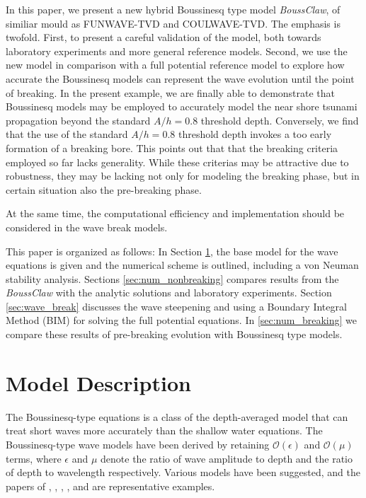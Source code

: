 \documentclass[review]{elsarticle}
\begin{document}
In this paper, we present a new hybrid Boussinesq type model {\em BoussClaw}, 
of similiar mould as FUNWAVE-TVD and COULWAVE-TVD. The emphasis is twofold.
First, to present a careful validation of the model, both towards  
laboratory experiments and more general reference models. Second, we use the new model
in comparison with a full potential reference model to explore how accurate the Boussinesq models 
can represent the wave evolution until the point of breaking. In the present example,
we are finally able to demonstrate that Boussinesq models may be employed
to accurately model the near shore tsunami propagation beyond the standard $A/h = 0.8$ threshold depth.
Conversely, we find that the use of the standard $A/h = 0.8$ threshold depth 
invokes a too early formation of a breaking bore. This points out that  
that the breaking criteria employed so far lacks generality.
While these criterias may be attractive due to robustness, 
they may be lacking not only for modeling the breaking phase, but in certain situation also the pre-breaking phase.

At the same time, the computational efficiency and implementation
should be considered in the wave break models. 

This paper is organized as follows: In Section \ref{sec:model}, the base model
for the wave equations is given and the numerical scheme is outlined, including a von Neuman stability analysis. 
Sections \ref{sec:num_nonbreaking} compares results from the {\em BoussClaw} with
the analytic solutions and laboratory experiments. 
Section \ref{sec:wave_break} discusses the wave steepening and using a Boundary Integral Method (BIM) for 
solving the full potential equations. In \ref{sec:num_breaking} we compare these results of pre-breaking
evolution with Boussinesq type models.

\section{Model Description}
\label{sec:model}

The Boussinesq-type equations
is a class of the depth-averaged model 
that can treat short waves more accurately
than the shallow water equations. 
The Boussinesq-type wave models have been derived by retaining 
$\mathcal{O}(\epsilon)$ and $\mathcal{O}(\mu)$ terms, 
where $\epsilon$ and $\mu$ 
denote the ratio of wave amplitude to depth
and the ratio of depth to wavelength respectively. 
Various models have been suggested,
and the papers of \citet{peregrine1967long},
\citet{madsen1992new}, \citet{nwogu1993alternative},
\citet{lynett2002modeling},
and \citet{wei1995time}
are representative examples. 
\end{document}
